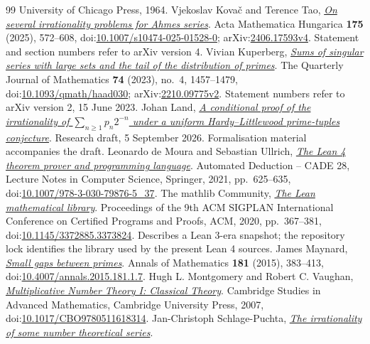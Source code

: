 \documentclass[11pt]{article}
\begin{document}
\begin{thebibliography}{99}
  University of Chicago Press, 1964.
 Vjekoslav Kova\v{c} and Terence Tao, \href{https://arxiv.org/abs/2406.17593v4}{\emph{On several irrationality problems for Ahmes series}}.
  Acta Mathematica Hungarica \textbf{175} (2025), 572--608, doi:\href{https://doi.org/10.1007/s10474-025-01528-0}{10.1007/s10474-025-01528-0}; arXiv:\href{https://arxiv.org/abs/2406.17593v4}{2406.17593v4}. Statement and section numbers refer to arXiv version 4.
 Vivian Kuperberg, \href{https://arxiv.org/abs/2210.09775v2}{\emph{Sums of singular series with large sets and the tail of the distribution of primes}}.
  The Quarterly Journal of Mathematics \textbf{74} (2023), no.~4, 1457--1479, doi:\href{https://doi.org/10.1093/qmath/haad030}{10.1093/qmath/haad030}; arXiv:\href{https://arxiv.org/abs/2210.09775v2}{2210.09775v2}. Statement numbers refer to arXiv version 2, 15 June 2023.
 Johan Land, \href{https://github.com/beetree/math_erdos_251}{\emph{A conditional proof of the irrationality of $\sum_{n\ge1}p_n2^{-n}$ under a uniform Hardy--Littlewood prime-tuples conjecture}}.
  Research draft, 5 September 2026. Formalisation material accompanies the draft.
 Leonardo de Moura and Sebastian Ullrich, \href{https://doi.org/10.1007/978-3-030-79876-5_37}{\emph{The Lean 4 theorem prover and programming language}}.
  Automated Deduction -- CADE 28, Lecture Notes in Computer Science, Springer, 2021, pp.~625--635, doi:\href{https://doi.org/10.1007/978-3-030-79876-5_37}{10.1007/978-3-030-79876-5\_37}.
 {The mathlib Community}, \href{https://doi.org/10.1145/3372885.3373824}{\emph{The Lean mathematical library}}.
  Proceedings of the 9th ACM SIGPLAN International Conference on Certified Programs and Proofs, ACM, 2020, pp.~367--381, doi:\href{https://doi.org/10.1145/3372885.3373824}{10.1145/3372885.3373824}. Describes a Lean 3-era snapshot; the repository lock identifies the library used by the present Lean 4 sources.
 James Maynard, \href{https://doi.org/10.4007/annals.2015.181.1.7}{\emph{Small gaps between primes}}.
  Annals of Mathematics \textbf{181} (2015), 383--413, doi:\href{https://doi.org/10.4007/annals.2015.181.1.7}{10.4007/annals.2015.181.1.7}.
 Hugh L. Montgomery and Robert C. Vaughan, \href{https://doi.org/10.1017/CBO9780511618314}{\emph{Multiplicative Number Theory I: Classical Theory}}.
  Cambridge Studies in Advanced Mathematics, Cambridge University Press, 2007, doi:\href{https://doi.org/10.1017/CBO9780511618314}{10.1017/CBO9780511618314}.
 Jan-Christoph Schlage-Puchta, \href{https://arxiv.org/abs/1105.1451v1}{\emph{The irrationality of some number theoretical series}}.

\end{thebibliography}
\end{document}
